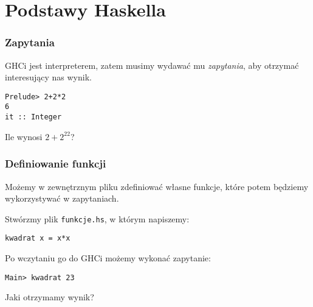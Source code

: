 \section{Podstawy Haskella}
\sectionframe

\begin{frame}[fragile]
  \frametitle{Zapytania}
  GHCi jest interpreterem, zatem musimy wydawać mu \textit{zapytania}, aby
  otrzymać interesujący nas wynik.

  \vfill
  \begin{center}
    \begin{minipage}{0.4\textwidth}
      \Large
      \begin{verbatim}
Prelude> 2+2*2
6
it :: Integer
      \end{verbatim}
    \end{minipage}
  \end{center}
  \vfill
  \pause

  Ile wynosi $2+2^{22}$?
\end{frame}

\begin{frame}[fragile]
  \frametitle{Definiowanie funkcji}
  
  Możemy w zewnętrznym pliku zdefiniować własne funkcje, które potem
  będziemy wykorzystywać w zapytaniach.
  \vspace{1em}
  \pause

  Stwórzmy plik \texttt{funkcje.hs}, w którym napiszemy:
  \begin{center}
    \Large{\texttt{kwadrat x = x*x}}
  \end{center}
  \vspace{1em}
  \pause

  Po wczytaniu go do GHCi możemy wykonać zapytanie:
  \begin{center}
    \Large{\texttt{Main> kwadrat 23}}
  \end{center}
  \vspace{1em}
  \pause

  Jaki otrzymamy wynik?

\end{frame}

